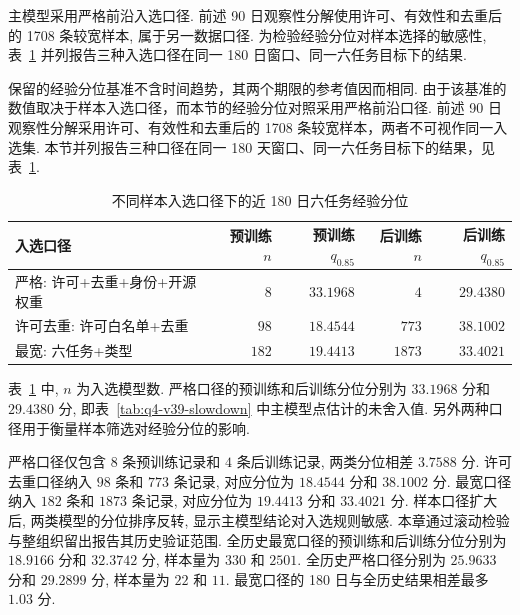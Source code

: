 主模型采用严格前沿入选口径. 前述 90 日观察性分解使用许可、有效性和去重后的 1708 条较宽样本, 属于另一数据口径. 为检验经验分位对样本选择的敏感性, 表~\ref{tab:q4-baseline-caliber} 并列报告三种入选口径在同一 180 日窗口、同一六任务目标下的结果.


保留的经验分位基准不含时间趋势，其两个期限的参考值因而相同. 由于该基准的数值取决于样本入选口径，而本节的经验分位对照采用严格前沿口径. 前述 90 日观察性分解采用许可、有效性和去重后的 1708 条较宽样本，两者不可视作同一入选集. 本节并列报告三种口径在同一 180 天窗口、同一六任务目标下的结果，见表~\ref{tab:q4-baseline-caliber}. 

\begin{table}[H]\centering\footnotesize
\setlength{\tabcolsep}{4pt}
  \caption{不同样本入选口径下的近 180 日六任务经验分位}\label{tab:q4-baseline-caliber}
  \begin{tabular}{lrrrr}\toprule
    入选口径             & 预训练 $n$ & 预训练 $q_{0.85}$         & 后训练 $n$ & 后训练 $q_{0.85}$        \\\midrule
    严格: 许可+去重+身份+开源权重 & $8$     & $33.1968$ & $4$     & $29.4380$ \\
    许可去重: 许可白名单+去重    & $98$    & $18.4544$ & $773$   & $38.1002$ \\
    最宽: 六任务+类型            & $182$   & $19.4413$ & $1873$  & $33.4021$ \\\bottomrule
  \end{tabular}
\end{table}
表~\ref{tab:q4-baseline-caliber} 中, $n$ 为入选模型数. 严格口径的预训练和后训练分位分别为 $33.1968$ 分和 $29.4380$ 分, 即表~\ref{tab:q4-v39-slowdown} 中主模型点估计的未舍入值. 另外两种口径用于衡量样本筛选对经验分位的影响.

严格口径仅包含 $8$ 条预训练记录和 $4$ 条后训练记录, 两类分位相差 $3.7588$ 分. 许可去重口径纳入 $98$ 条和 $773$ 条记录, 对应分位为 $18.4544$ 分和 $38.1002$ 分. 最宽口径纳入 $182$ 条和 $1873$ 条记录, 对应分位为 $19.4413$ 分和 $33.4021$ 分. 样本口径扩大后, 两类模型的分位排序反转, 显示主模型结论对入选规则敏感. 本章通过滚动检验与整组织留出报告其历史验证范围. 全历史最宽口径的预训练和后训练分位分别为 $18.9166$ 分和 $32.3742$ 分, 样本量为 $330$ 和 $2501$. 全历史严格口径分别为 $25.9633$ 分和 $29.2899$ 分, 样本量为 $22$ 和 $11$. 最宽口径的 180 日与全历史结果相差最多 $1.03$ 分.


